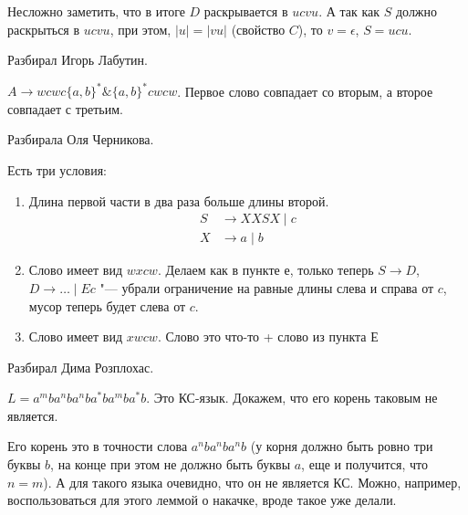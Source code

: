 Несложно заметить, что в итоге $D$ раскрывается в $ucvu$.
А так как $S$ должно раскрыться в $ucvu$, при этом, $|u| = |vu|$ (свойство $C$), то $v = \epsilon$, $S = ucu$.

Разбирал Игорь Лабутин.

$A \to wcwc \{a, b\}^* \& \{a, b\}^*cwcw$. 
Первое слово совпадает со вторым, а второе совпадает с третьим.

Разбирала Оля Черникова.

Есть три условия:
\begin{enumerate}
    \item
        Длина первой части в два раза больше длины второй.
        \begin{align*}
        S &\to XXSX \mid c \\
        X &\to a \mid b
        \end{align*}

    \item
        Слово имеет вид $wxcw$. Делаем как в пункте е, только теперь $S \to D$, $D \to \dots \mid Ec$ "--- убрали ограничение на равные длины слева и справа от $c$, мусор теперь будет слева от $c$.
    \item
        Слово имеет вид $xwcw$. Слово это что-то + слово из пункта Е
    
\end{enumerate}

\TODO

Разбирал Дима Розплохас.

$L = a^m b a^n b a^n b a^* b a^m b a^* b$. Это КС-язык. Докажем, что его корень таковым не является.

Его корень это в точности слова $a^n b a^n b a^n b$ (у корня должно быть ровно три буквы $b$, на конце при этом не должно быть буквы $a$, еще и получится, что $n=m$).
А для такого языка очевидно, что он не является КС. Можно, например, воспользоваться для этого леммой о накачке, вроде такое уже делали.
